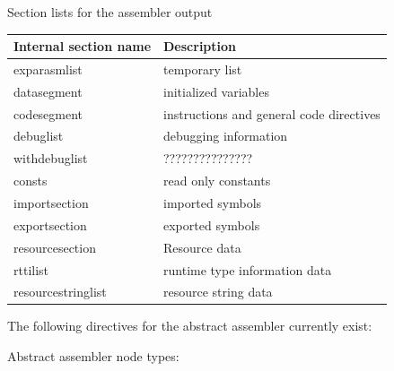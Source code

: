 \documentclass [12pt]{article}
\begin{document}
\begin{center}
Section lists for the assembler output
\end{center}

\begin{longtable}{|l|p{10cm}|}
\hline
Internal section name & Description \\
\hline
\endhead
\hline
\endfoot
exparasmlist    & temporary list \\
datasegment     & initialized variables \\
codesegment     & instructions and general code directives \\
debuglist       & debugging information \\
withdebuglist   & ??????????????? \\
consts          & read only constants \\
importsection   & imported symbols \\
exportsection   & exported symbols \\
resourcesection & Resource data \\
rttilist        & runtime type information data \\
resourcestringlist& resource string data
\end{longtable}

The following directives for the abstract assembler currently exist: 

Abstract assembler node types:
\end{document}

